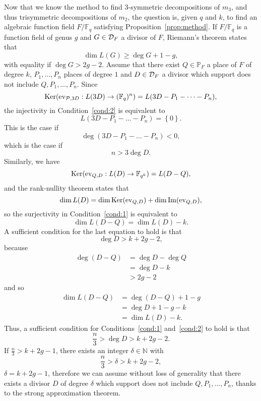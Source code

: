 \documentclass[11pt]{article}
\begin{document}
Now that we know the method to find $3$-symmetric decompositions of $m_3$, and thus
trisymmetric decompositions of $m_2$, the question is, given $q$ and $k$, to
find an algebraic function field $F/\mathbb{F}_{q}$ satisfying
Proposition~\ref{prop:method}. If $F/\mathbb{F}_q$ is a function field of genus
$g$ and $G\in\mathcal{D}_F$ a divisor of $F$, Riemann's theorem states that
\[
  \dim L(G) \geq \deg G + 1 - g,
\]
with equality if $\deg G > 2g - 2$. Assume that there exist $Q\in\mathbb{P}_F$ a
place of $F$ of degree $k$, $P_1, \dots, P_n$ places of degree $1$ and
$D\in\mathcal{D}_F$ a divisor which support does not include $Q, P_1, \dots, P_n$. Since
\[
  \operatorname{Ker}(\operatorname{ev}_{\mathcal{P}, 3D}:L(3D)\to(\mathbb{F}_{q})^n) = L(3D-P_1-\dots-P_n),
\]
the injectivity in Condition~\eqref{cond:2} is equivalent to
\[
  L(3D-P_1-\dots-P_n)=\left\{ 0 \right\}.
\]
This is the case if
\[
\deg(3D-P_1-\dots-P_n)<0,
\]
which is the case if
\[
  n > 3\deg D.
\]
Similarly, we have
\[
  \operatorname{Ker}(\operatorname{ev}_{Q, D}:L(D)\to\mathbb{F}_{q^k}) = L(D-Q),
\]
and the rank-nullity theorem states that
\[
  \dim L(D) = \dim\operatorname{Ker}(\operatorname{ev}_{Q, D})+\dim\operatorname{Im}(\operatorname{ev}_{Q, D}),
\]
so the surjectivity in Condition~\eqref{cond:1} is equivalent to
\[
  \dim L(D-Q) = \dim L(D) - k.
\]
A sufficient condition for the last equation to hold is that
\[
  \deg D > k+ 2g - 2,
\]
because
\begin{equation*}
  \begin{split}
  \deg(D-Q) &= \deg D - \deg Q\\
  &= \deg D - k\\
  &> 2g - 2
  \end{split}
\end{equation*}
and so
\begin{equation*}
  \begin{split}
    \dim L(D-Q) &= \deg(D-Q)+1-g\\
    &=\deg D+1-g-k\\
    &=\dim L(D)-k.
  \end{split}
\end{equation*}
Thus, a sufficient condition for Conditions~\eqref{cond:1} and~\eqref{cond:2} to
hold is that
\[
  \frac{n}{3} > \deg D > k + 2g - 2.
\]
If $\frac{n}{3}>k + 2g -1$, there exists an integer $\delta\in\mathbb{N}$ with
\[
  \frac{n}{3} > \delta > k +2g -2,
\]
\eg $\delta=k+2g-1$, therefore we can assume without loss of generality that there
exists a divisor $D$ of degree $\delta$ which support does not include $Q, P_1,
\dots, P_n$, thanks to the strong approximation theorem.
\end{document}
